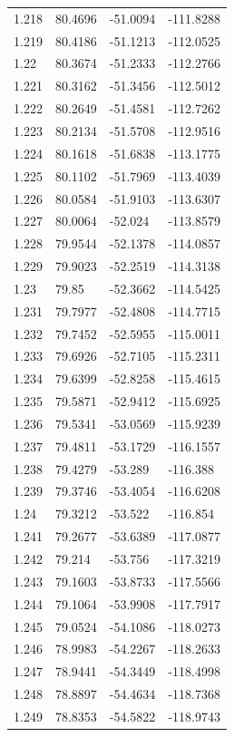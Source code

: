 \begin{tabular}{llll}
1.218 & 80.4696 & -51.0094 & -111.8288 \\
1.219 & 80.4186 & -51.1213 & -112.0525 \\
1.22 & 80.3674 & -51.2333 & -112.2766 \\
1.221 & 80.3162 & -51.3456 & -112.5012 \\
1.222 & 80.2649 & -51.4581 & -112.7262 \\
1.223 & 80.2134 & -51.5708 & -112.9516 \\
1.224 & 80.1618 & -51.6838 & -113.1775 \\
1.225 & 80.1102 & -51.7969 & -113.4039 \\
1.226 & 80.0584 & -51.9103 & -113.6307 \\
1.227 & 80.0064 & -52.024 & -113.8579 \\
1.228 & 79.9544 & -52.1378 & -114.0857 \\
1.229 & 79.9023 & -52.2519 & -114.3138 \\
1.23 & 79.85 & -52.3662 & -114.5425 \\
1.231 & 79.7977 & -52.4808 & -114.7715 \\
1.232 & 79.7452 & -52.5955 & -115.0011 \\
1.233 & 79.6926 & -52.7105 & -115.2311 \\
1.234 & 79.6399 & -52.8258 & -115.4615 \\
1.235 & 79.5871 & -52.9412 & -115.6925 \\
1.236 & 79.5341 & -53.0569 & -115.9239 \\
1.237 & 79.4811 & -53.1729 & -116.1557 \\
1.238 & 79.4279 & -53.289 & -116.388 \\
1.239 & 79.3746 & -53.4054 & -116.6208 \\
1.24 & 79.3212 & -53.522 & -116.854 \\
1.241 & 79.2677 & -53.6389 & -117.0877 \\
1.242 & 79.214 & -53.756 & -117.3219 \\
1.243 & 79.1603 & -53.8733 & -117.5566 \\
1.244 & 79.1064 & -53.9908 & -117.7917 \\
1.245 & 79.0524 & -54.1086 & -118.0273 \\
1.246 & 78.9983 & -54.2267 & -118.2633 \\
1.247 & 78.9441 & -54.3449 & -118.4998 \\
1.248 & 78.8897 & -54.4634 & -118.7368 \\
1.249 & 78.8353 & -54.5822 & -118.9743 \\

\end{tabular}
